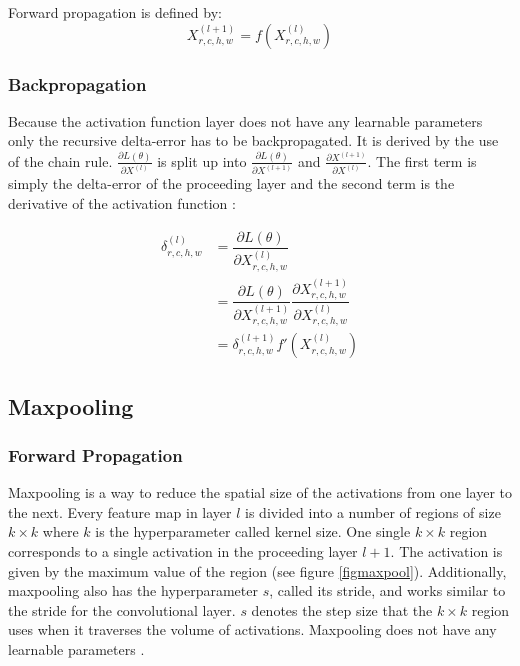 \documentclass[a4paper, twoside]{article}
\newcommand*{\pd}[2]{\ensuremath{\dfrac{\partial #1}{\partial #2}}}
\newcommand*{\inpd}[2]{\ensuremath{\frac{\partial #1}{\partial #2}}}
\begin{document}
Forward propagation is defined by:
\begin{equation}\label{eqactivation}
X^{(l+1)}_{r,c,h,w} = f(X^{(l)}_{r,c,h,w})
\end{equation}

\subsubsection{Backpropagation}
Because the activation function layer does not have any learnable parameters only the recursive delta-error has to be backpropagated. It is derived by the use of the chain rule. $\inpd{L(\theta)}{X^{(l)}}$ is split up into $\inpd{L(\theta)}{X^{(l+1)}}$ and $\inpd{X^{(l+1)}}{X^{(l)}}$. The first term is simply the delta-error of the proceeding layer and the second term is the derivative of the activation function \cite{cs231n} \cite{convmath}: 

\begin{equation}
\begin{split}
\delta^{(l)}_{r,c,h,w}
		& = \pd{L(\theta)}{X^{(l)}_{r,c,h,w}} \\
		& = \pd{L(\theta)}{X^{(l+1)}_{r,c,h,w}} \pd{X^{(l+1)}_{r,c,h,w}}{X^{(l)}_{r,c,h,w}} \\
		& = \delta^{(l+1)}_{r,c,h,w} f'(X^{(l)}_{r,c,h,w})
\end{split}
\end{equation}

\subsection{Maxpooling}
\subsubsection{Forward Propagation}
Maxpooling is a way to reduce the spatial size of the activations from one layer to the next. Every feature map in layer $l$ is divided into a number of regions of size $k \times k$ where $k$ is the hyperparameter called kernel size. One single $k \times k$ region corresponds to a single activation in the proceeding layer $l+1$. The activation is given by the maximum value of the region (see figure \ref{figmaxpool}). Additionally, maxpooling also has the hyperparameter $s$, called its stride, and works similar to the stride for the convolutional layer. $s$ denotes the step size that the $k \times k$ region uses when it traverses the volume of activations. Maxpooling does not have any learnable parameters \cite{cs231n} \cite{convmath} \cite{convarithmetic}. 
\end{document}
